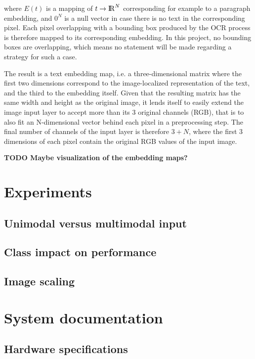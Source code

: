 \documentclass[english, bibtex]{kththesis}
\begin{document}
where $E(t)$ is a mapping of $t \rightarrow {\rm I\!R}^N$ corresponding for example to a paragraph embedding, and $0^N$ is a null vector in case there is no text in the corresponding pixel. Each pixel overlapping with a bounding box produced by the OCR process is therefore mapped to its corresponding embedding. In this project, no bounding boxes are overlapping, which means no statement will be made regarding a strategy for such a case.

The result is a text embedding map, i.e. a three-dimensional matrix where the first two dimensions correspond to the image-localized representation of the text, and the third to the embedding itself. Given that the resulting matrix has the same width and height as the original image, it lends itself to easily extend the image input layer to accept more than its 3 original channels (RGB), that is to also fit an N-dimensional vector behind each pixel in a preprocessing step. The final number of channels of the input layer is therefore $3+N$, where the first 3 dimensions of each pixel contain the original RGB values of the input image. 

\textbf{TODO Maybe visualization of the embedding maps?}


\clearpage

\section{Experiments}
\label{sec:experiments}


\subsection{Unimodal versus multimodal input}

\subsection{Class impact on performance}

\subsection{Image scaling}


\section{System documentation}

\subsection{Hardware specifications}
\end{document}
